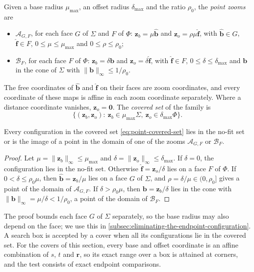 Given a base radius $\mu_{\max}$, an offset radius $\delta_{\max}$ and the
ratio $\rho_0$, the \emph{point zooms} are
\begin{itemize}
  \item $\mathcal A_{G,F}$, for each face $G$ of $\Sigma$ and $F$ of $\Phi$:
    $\mathbf z_b=\mu\widehat{\mathbf b}$ and
    $\mathbf z_o=\rho\mu\widehat{\mathbf f}$, with $\widehat{\mathbf b}\in G$,
    $\widehat{\mathbf f}\in F$, $0\le\mu\le\mu_{\max}$ and $0\le\rho\le\rho_0$;
  \item $\mathcal B_F$, for each face $F$ of $\Phi$: $\mathbf z_b=\delta\mathbf b$
    and $\mathbf z_o=\delta\widehat{\mathbf f}$, with $\widehat{\mathbf f}\in F$,
    $0\le\delta\le\delta_{\max}$ and $\mathbf b$ in the cone of $\Sigma$ with
    $\lVert\mathbf b\rVert_\infty\le1/\rho_0$.
\end{itemize}
The free coordinates of $\widehat{\mathbf b}$ and $\widehat{\mathbf f}$ on
their faces are zoom coordinates, and every coordinate of these maps is
affine in each zoom coordinate separately. Where a distance coordinate
vanishes, $\mathbf z_o=\mathbf0$. The \emph{covered set} of the family is
\begin{equation}\label{eq:point-covered-set}
  \{(\mathbf z_b,\mathbf z_o):\ \mathbf z_b\in\mu_{\max}\Sigma,\ \mathbf z_o\in\delta_{\max}\Phi\}.
\end{equation}

\begin{lemma}\label{lem:point-coverage}
  Every configuration in the covered set \cref{eq:point-covered-set} lies
  in the no-fit set or is the image of a point in the domain of one of the
  zooms $\mathcal A_{G,F}$ or $\mathcal B_F$.
\end{lemma}
\begin{proof}
  Let $\mu=\lVert\mathbf z_b\rVert_\infty\le\mu_{\max}$ and
  $\delta=\lVert\mathbf z_o\rVert_\infty\le\delta_{\max}$. If $\delta=0$, the
  configuration lies in the no-fit set. Otherwise
  $\widehat{\mathbf f}=\mathbf z_o/\delta$ lies on a face $F$ of $\Phi$.
  If $0<\delta\le\rho_0\mu$, then $\widehat{\mathbf b}=\mathbf z_b/\mu$ lies on a face
  $G$ of $\Sigma$, and $\rho=\delta/\mu\in(0,\rho_0]$ gives a point of the domain
  of $\mathcal A_{G,F}$. If $\delta>\rho_0\mu$, then $\mathbf b=\mathbf z_b/\delta$ lies in
  the cone with $\lVert\mathbf b\rVert_\infty=\mu/\delta<1/\rho_0$, a point of
  the domain of $\mathcal B_F$.
\end{proof}

The proof bounds each face $G$ of $\Sigma$ separately, so the base radius
may also depend on the face; we use this in
\cref{subsec:eliminating-the-endpoint-configuration}. A search box is
accepted by a cover when all its configurations lie in the covered set.
For the covers of this section, every base and offset coordinate is an
affine combination of $s$, $t$ and $\mathbf r$, so its exact range over a box
is attained at corners, and the test consists of exact endpoint
comparisons.

